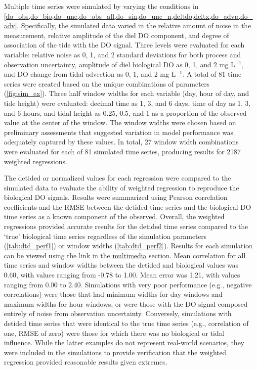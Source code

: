 \documentclass[letterpaper,12pt,oneside]{article}\usepackage[]{graphicx}\usepackage[]{color}
\begin{document}
Multiple time series were simulated by varying the conditions in \cref{do_obs,do_bio,do_unc,do_obs_all,do_sin,do_unc_n,deltdo,deltx,do_advp,do_adv}. Specifically, the simulated data varied in the relative amount of noise in the measurement, relative amplitude of the diel \ac{DO} component, and degree of association of the tide with the \ac{DO} signal.  Three levels were evaluated for each variable: relative noise as 0, 1, and 2 standard deviations for both process and observation uncertainty, amplitude of diel biological \ac{DO} as 0, 1, and 2 mg L$^{-1}$, and \ac{DO} change from tidal advection as 0, 1, and 2 mg L$^{-1}$. A total of 81 time series were created based on the unique combinations of parameters (\cref{fig:sim_ex}).  Three half window widths for each variable (day, hour of day, and tide height) were evaluated: decimal time as 1, 3, and 6 days, time of day as 1, 3, and 6 hours, and tidal height as 0.25, 0.5, and 1 as a proportion of the observed value at the center of the window.  The window widths were chosen based on preliminary assessments that suggested variation in model performance was adequately captured by these values.  In total, 27 window width combinations were evaluated for each of 81 simulated time series, producing results for 2187 weighted regressions.

The detided or normalized values for each regression were compared to the simulated data to evaluate the ability of weighted regression to reproduce the biological \ac{DO} signals. Results were summarized using Pearson correlation coefficients and the \ac{RMSE} between the detided time series and the biological \ac{DO} time series as a known component of the observed.  Overall, the weighted regressions provided accurate results for the detided time series compared to the `true' biological time series regardless of the simulation parameters (\cref{tab:dtd_perf1}) or window widths (\cref{tab:dtd_perf2}).  Results for each simulation can be viewed using the link in the \hyperref[multi]{multimedia} section.  Mean correlation for all time series and window widths between the detided and biological values was 0.60, with values ranging from -0.78 to 1.00.  Mean error was 1.21, with values ranging from 0.00 to 2.40.  Simulations with very poor performance (e.g., negative correlations) were those that had minimum widths for day windows and maximum widths for hour windows, or were those with the \ac{DO} signal composed entirely of noise from observation uncertainty. Conversely, simulations with detided time series that were identical to the true time series (e.g., correlation of one, \ac{RMSE} of zero) were those for which there was no biological or tidal influence.  While the latter examples do not represent real-world scenarios, they were included in the simulations to provide verification that the weighted regression provided reasonable results given extremes.  
\end{document}
